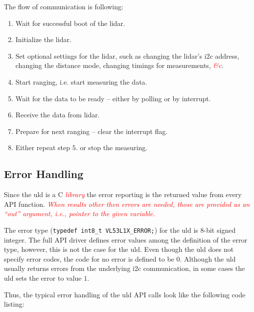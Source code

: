 \documentclass[
  digital,     %
  oneside,     %
  nosansbold,  %
  nocolorbold, %
  lof,         %
  lot,         %
]{fithesis4}
\newcommand{\TODO}[1]{\textcolor{red}{\textit{#1}}}
\begin{document}
{{{The flow of communication is following:
\begin{enumerate}
    \item Wait for successful boot of the \acrshort{lidar}.
    
    \item Initialize the \acrshort{lidar}.
    
    \item  Set optional settings for the \acrshort{lidar}, such as changing the \acrshort{lidar}'s \acrshort{i2c} address, changing the distance mode, changing timings for measurements, \TODO{\&c}.
    
    \item Start ranging, i.e. start measuring the data.
    
    \item Wait for the data to be ready -- either by polling or by interrupt.
    
    \item Receive the data from \acrshort{lidar}.
    
    \item Prepare for next ranging -- clear the interrupt flag.
    
    \item Either repeat step $5.$ or stop the measuring.
\end{enumerate}


\subsection{ Error Handling }

Since the \acrshort{uld} is a C \TODO{library} the error reporting is the returned value from every API function. \TODO{When results other then errors are needed, those are provided as an ``out'' argument, i.e., pointer to the given variable.}

The error type (\lstinline[breaklines=false]|typedef int8_t VL53L1X_ERROR;|) for the \acrshort{uld} is 8-bit signed integer. The full API driver defines error values among the definition of the error type, however, this is not the case for the \acrshort{uld}. Even though the \acrshort{uld} does not specify error codes, the code for no error is defined to be $0$. Although the \acrshort{uld} usually returns errors from the underlying \acrshort{i2c} communication, in some cases the \acrshort{uld} sets the error to value $1$.

Thus, the typical error handling of the \acrshort{uld} API calls look like the following code listing:

}}}
\end{document}
